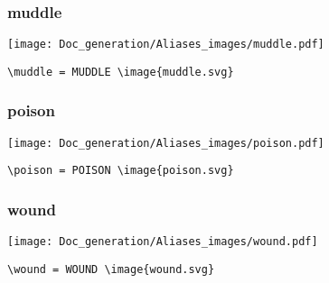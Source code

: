 \documentclass{article}
\begin{document}
\subsubsection{muddle}
\begin{minipage}{0.45\linewidth}
\raggedright
\begin{spverbatim}
\muddle 
\end{spverbatim}
\end{minipage}
\begin{minipage}{0.45\linewidth}
\raggedleft
\texttt{[image: Doc\_generation/Aliases\_images/muddle.pdf]}
\end{minipage}
\begin{center}
\begin{BVerbatim}
\muddle = MUDDLE \image{muddle.svg}
\end{BVerbatim}
\end{center}

\subsubsection{poison}
\begin{minipage}{0.45\linewidth}
\raggedright
\begin{spverbatim}
\poison 
\end{spverbatim}
\end{minipage}
\begin{minipage}{0.45\linewidth}
\raggedleft
\texttt{[image: Doc\_generation/Aliases\_images/poison.pdf]}
\end{minipage}
\begin{center}
\begin{BVerbatim}
\poison = POISON \image{poison.svg}
\end{BVerbatim}
\end{center}

\subsubsection{wound}
\begin{minipage}{0.45\linewidth}
\raggedright
\begin{spverbatim}
\wound 
\end{spverbatim}
\end{minipage}
\begin{minipage}{0.45\linewidth}
\raggedleft
\texttt{[image: Doc\_generation/Aliases\_images/wound.pdf]}
\end{minipage}
\begin{center}
\begin{BVerbatim}
\wound = WOUND \image{wound.svg}
\end{BVerbatim}
\end{center}
\end{document}
